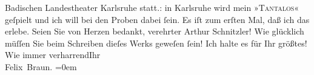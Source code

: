 \begin{ledgroupsized}[t]{13cm}
{{{                            Badischen Landestheater Karlsruhe
                        statt.}}}\label{K_L02468_1h}: in Karlsruhe wird mein »\textsc{Tantalos}« geſpielt und ich will bei den {\pb}Proben
                    dabei ſein. Es iſt zum erſten Mal, daß ich das erlebe.\pend
           \pstart
           Seien Sie von Herzen bedankt, verehrter Arthur Schnitzler! Wie glücklich müſſen
                    Sie beim Schreiben dieſes Werks geweſen ſein! Ich halte es für Ihr größtes!\pend
           \pstart
           Wie immer verharrend\hspace*{1.5em}Ihr{\\[\baselineskip]}\spacefill\mbox{Felix Braun.}\pend
           \leftskip=0em{}\endnumbering{}\end{ledgroupsized}  \newcommand{\dateiname}{L02468}\newcommand{\titel}{Felix Braun an Arthur Schnitzler, 15. 3. 1926}\newcommand{\editorInnen}{Martin Anton Müller und Gerd-Hermann Susen}
            \footnotesize
\begin{ledgroupsized}[t]{11.5cm}
\end{ledgroupsized}
         
      